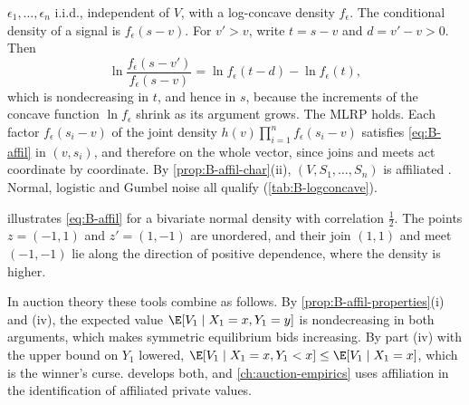 \begin{example}
\begin{enumerate}[label=(\alph*)]
  $\epsilon_1, \dots, \epsilon_n$ i.i.d., independent of $V$, with a log-concave density $f_\epsilon$. The conditional density of a
  signal is $f_\epsilon(s - v)$. For $v' > v$, write $t = s - v$ and $d = v' - v > 0$. Then
  \[
    \ln\frac{f_\epsilon(s - v')}{f_\epsilon(s - v)} = \ln f_\epsilon(t - d) - \ln f_\epsilon(t),
  \]
  which is nondecreasing in $t$, and hence in $s$, because the increments of the concave function $\ln f_\epsilon$ shrink as its
  argument grows. The MLRP holds. Each factor $f_\epsilon(s_i - v)$ of the joint density
  $h(v)\prod_{i=1}^n f_\epsilon(s_i - v)$ satisfies \eqref{eq:B-affil} in $(v, s_i)$, and therefore on the whole vector, since
  joins and meets act coordinate by coordinate. By \cref{prop:B-affil-char}(ii), $(V, S_1, \dots, S_n)$ is affiliated
  \citep[p.~1099]{MilgromWeber1982}. Normal, logistic and Gumbel noise all qualify (\cref{tab:B-logconcave}).
\end{enumerate}
\end{example}

 illustrates \eqref{eq:B-affil} for a bivariate normal density with correlation
$\frac{1}{2}$. The points $z = (-1, 1)$ and $z' = (1, -1)$ are unordered, and their join $(1, 1)$ and meet $(-1, -1)$ lie
along the direction of positive dependence, where the density is higher.

In auction theory these tools combine as follows. By \cref{prop:B-affil-properties}(i) and (iv), the expected value
$\E[V_1 \mid X_1 = x, Y_1 = y]$ is nondecreasing in both arguments, which makes symmetric equilibrium bids increasing.
By part (iv) with the upper bound on $Y_1$ lowered, $\E[V_1 \mid X_1 = x, Y_1 < x] \leq \E[V_1 \mid X_1 = x]$, which is the winner's
curse.  develops both, and \cref{ch:auction-empirics} uses affiliation in the
identification of affiliated private values.

